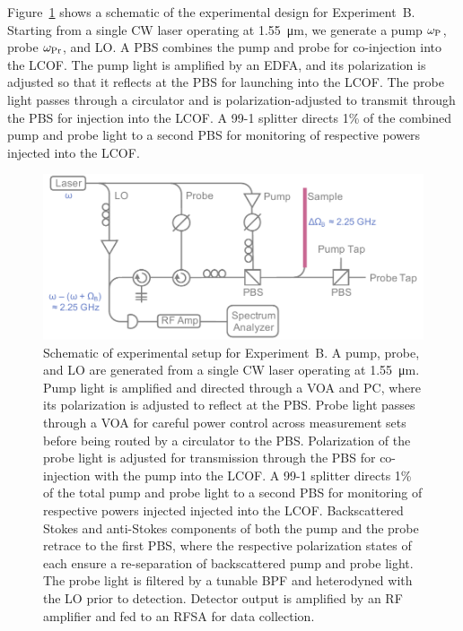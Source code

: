 Figure~\ref{fig:Cooling:ExperimentBDesign} shows a schematic of the experimental design for Experiment~B. Starting from a single \ac{CW} laser operating at \SI{1.55}{\micro\meter}, we generate a pump \(\omega_{\rm P}\), probe \(\omega_{\rm Pr}\), and \ac{LO}. A \ac{PBS} combines the pump and probe for co-injection into the \ac{LCOF}. The pump light is amplified by an \ac{EDFA}, and its polarization is adjusted so that it reflects at the \ac{PBS} for launching into the \ac{LCOF}. The probe light passes through a circulator and is polarization-adjusted to transmit through the \ac{PBS} for injection into the \ac{LCOF}. A 99-1 splitter directs 1\% of the combined pump and probe light to a second \ac{PBS} for monitoring of respective powers injected into the \ac{LCOF}.

\begin{figure}[t]
  \centering
  \includegraphics[width=\textwidth]{figs/2-Cooling/pumpProbeDesign.pdf}
  \caption[Schematic of experimental setup for Experiment~B.]{Schematic of experimental setup for Experiment~B. A pump, probe, and \ac{LO} are generated from a single \ac{CW} laser operating at \SI{1.55}{\micro\meter}. Pump light is amplified and directed through a \ac{VOA} and \ac{PC}, where its polarization is adjusted to reflect at the \ac{PBS}. Probe light passes through a \ac{VOA} for careful power control across measurement sets before being routed by a circulator to the \ac{PBS}. Polarization of the probe light is adjusted for transmission through the \ac{PBS} for co-injection with the pump into the \ac{LCOF}. A 99-1 splitter directs 1\% of the total pump and probe light to a second \ac{PBS} for monitoring of respective powers injected injected into the \ac{LCOF}. Backscattered Stokes and anti-Stokes components of both the pump and the probe retrace to the first \ac{PBS}, where the respective polarization states of each ensure a re-separation of backscattered pump and probe light. The probe light is filtered by a tunable \ac{BPF} and heterodyned with the \ac{LO} prior to detection. Detector output is amplified by an \ac{RF} amplifier and fed to an \ac{RFSA} for data collection.}
  \label{fig:Cooling:ExperimentBDesign}
\end{figure}

